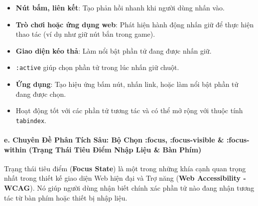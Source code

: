 \documentclass[11pt,oneside]{book}
\newcommand{\codeinline}[1]{\textcolor{accentOrange}{\texttt{#1}}}
\newcommand{\term}[1]{\textbf{\textcolor{primaryBlue}{#1}}}
\begin{document}
\begin{tipBox}
\begin{itemize}[leftmargin=1.5em, itemsep=3pt, parsep=0pt]
    \item \textbf{Nút bấm, liên kết}: Tạo phản hồi nhanh khi người dùng nhấn vào.
    \item \textbf{Trò chơi hoặc ứng dụng web}: Phát hiện hành động nhấn giữ để thực hiện thao tác (ví dụ như giữ nút bắn trong game).
    \item \textbf{Giao diện kéo thả}: Làm nổi bật phần tử đang được nhấn giữ.
\end{itemize}
\end{tipBox}

\begin{conceptBox}
\begin{itemize}[leftmargin=1.5em, itemsep=2pt, parsep=0pt]
    \item \codeinline{:active} giúp chọn phần tử trong lúc nhấn giữ chuột.
    \item \textbf{Ứng dụng}: Tạo hiệu ứng bấm nút, nhấn link, hoặc làm nổi bật phần tử đang được chọn.
    \item Hoạt động tốt với các phần tử tương tác và có thể mở rộng với thuộc tính \codeinline{tabindex}.
\end{itemize}
\end{conceptBox}

\paragraph{e. Chuyên Đề Phân Tích Sâu: Bộ Chọn :focus, :focus-visible \& :focus-within (Trạng Thái Tiêu Điểm Nhập Liệu \& Bàn Phím)}

Trạng thái tiêu điểm (\term{Focus State}) là một trong những khía cạnh quan trọng nhất trong thiết kế giao diện Web hiện đại và Trợ năng (\term{Web Accessibility - WCAG}). Nó giúp người dùng nhận biết chính xác phần tử nào đang nhận tương tác từ bàn phím hoặc thiết bị nhập liệu.
\end{document}
